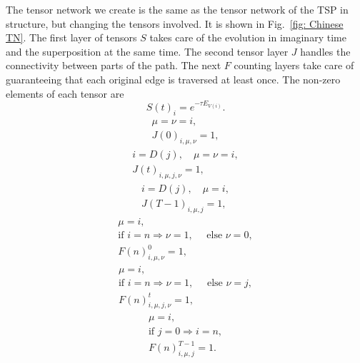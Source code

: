 The tensor network we create is the same as the tensor network of the TSP in structure, but changing the tensors involved. It is shown in Fig.~\ref{fig: Chinese TN}. The first layer of tensors $S$ takes care of the evolution in imaginary time and the superposition at the same time. The second tensor layer $J$ handles the connectivity between parts of the path. The next $F$ counting layers take care of guaranteeing that each original edge is traversed at least once. The non-zero elements of each tensor are
\begin{equation}
        S(t)_i = e^{-\tau E_{V(i)}}.
\end{equation}
\begin{equation}
     \begin{gathered}
        \mu=\nu=i,\\
        J(0)_{i,\mu,\nu} = 1,
     \end{gathered}
\end{equation}
\begin{equation}
     \begin{gathered}
        i=D(j),\quad \mu=\nu=i,\\
        J(t)_{i,\mu,j,\nu} = 1,
     \end{gathered}
\end{equation}
\begin{equation}
     \begin{gathered}
        i=D(j),\quad \mu=i,\\
        J(T-1)_{i,\mu,j} = 1,
     \end{gathered}
\end{equation}
\begin{equation}
     \begin{gathered}
        \mu=i,\\
        \text{if } i=n\Rightarrow \nu=1,\quad \text{ else } \nu=0,\\
        F(n)^0_{i,\mu,\nu} = 1,
     \end{gathered}
\end{equation}
\begin{equation}
     \begin{gathered}
        \mu=i,\\
        \text{if } i=n\Rightarrow \nu=1,\quad \text{ else } \nu=j,\\
        F(n)^t_{i,\mu,j,\nu} = 1,
     \end{gathered}
\end{equation}
\begin{equation}
     \begin{gathered}
        \mu=i,\\
        \text{if } j=0\Rightarrow i=n,\\
        F(n)^{T-1}_{i,\mu,j} = 1.
     \end{gathered}
\end{equation}

